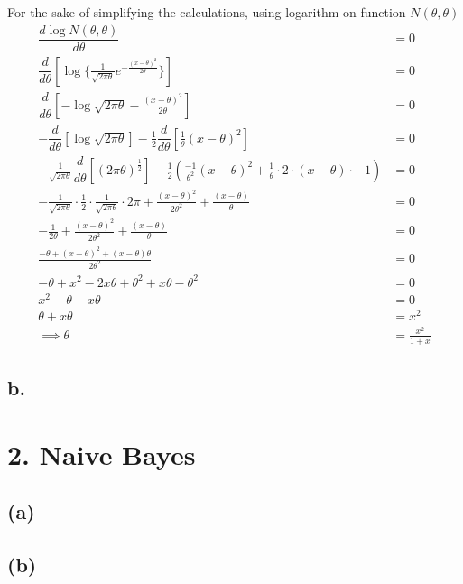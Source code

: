 \documentclass[letterpaper,doc,notimes]{apa6}
\begin{document}
\begin{description}
For the sake of simplifying the calculations, using logarithm on function $N(\theta, \theta)$
\begin{align*}
	\dfrac{d \log{N(\theta,\theta)}}{d\theta} &= 0 \\
	\dfrac{d}{d\theta}[\log{\{\frac{1}{\sqrt{2\pi\theta}} e^{-\frac{(x-\theta)^2}{2\theta}}\}} ] &= 0 \\
	\dfrac{d}{d\theta}[-\log\sqrt{2\pi\theta} -\frac{(x-\theta)^2}{2\theta}] &= 0 \\
	-\dfrac{d}{d\theta}[\log\sqrt{2\pi\theta}] - \frac{1}{2} \dfrac{d}{d\theta}[\frac{1}{\theta} (x-\theta)^2] &= 0 \\
	- \frac{1}{\sqrt{2\pi\theta}} \dfrac{d}{d\theta}[(2\pi\theta)^\frac{1}{2}] - \frac{1}{2}( \frac{-1}{\theta^2} (x-\theta)^2 + \frac{1}{\theta} \cdot 2 \cdot (x-\theta) \cdot -1 ) &= 0 \\
	- \frac{1}{\sqrt{2\pi\theta}} \cdot \frac{1}{2} \cdot \frac{1}{\sqrt{2\pi\theta}} \cdot 2\pi + \frac{(x-\theta)^2}{2\theta^2}  + \frac{(x-\theta)}{\theta} &= 0 \\
	-\frac{1}{2 \theta} + \frac{(x-\theta)^2}{2\theta^2}  + \frac{(x-\theta)}{\theta} &= 0 \\
	\frac{-\theta + (x-\theta)^2 + (x-\theta)\theta}{2\theta^2} &= 0 \\
	-\theta + x^2 - 2x\theta + \theta^2 +x\theta -\theta^2 &= 0 \\
	x^2  -\theta - x\theta &= 0 \\
	\theta + x\theta &= x^2 \\
	\implies \theta &= \frac{x^2}{1+x}
\end{align*}


	
\end{description}

\subsection{b.}

\section{2. Naive Bayes}
\subsection{(a)}

\subsection{(b)}
\end{document}
